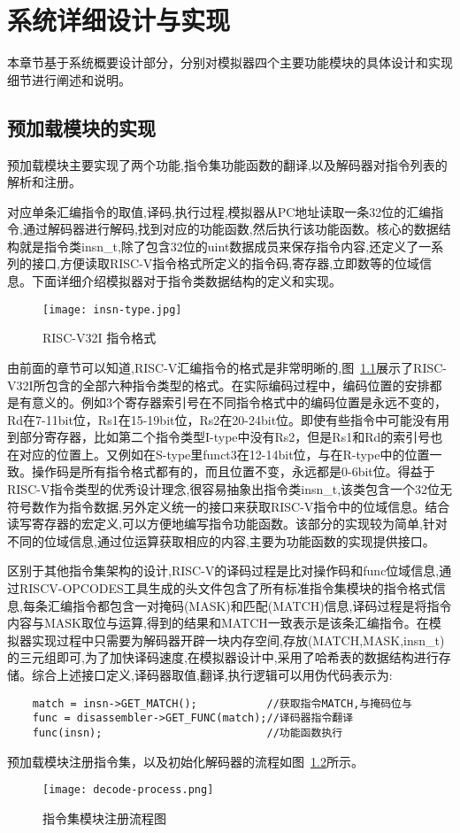 
\chapter{系统详细设计与实现}

本章节基于系统概要设计部分，分别对模拟器四个主要功能模块的具体设计和实现细节进行阐述和说明。

\section{预加载模块的实现}

预加载模块主要实现了两个功能,指令集功能函数的翻译,以及解码器对指令列表的解析和注册。

对应单条汇编指令的取值,译码,执行过程,模拟器从PC地址读取一条32位的汇编指令,通过解码器进行解码,找到对应的功能函数,然后执行该功能函数。核心的数据结构就是指令类insn\_t,除了包含32位的uint数据成员来保存指令内容,还定义了一系列的接口,方便读取RISC-V指令格式所定义的指令码,寄存器,立即数等的位域信息。下面详细介绍模拟器对于指令类数据结构的定义和实现。
\begin{figure}[h]
    \centering
    \texttt{[image: insn-type.jpg]}
    \caption{RISC-V32I 指令格式}
    \label{fig:insn-type}
\end{figure}


由前面的章节可以知道,RISC-V汇编指令的格式是非常明晰的,图~\ref{fig:insn-type}展示了RISC-V32I所包含的全部六种指令类型的格式。在实际编码过程中，编码位置的安排都是有意义的。例如3个寄存器索引号在不同指令格式中的编码位置是永远不变的，Rd在7-11bit位，Rs1在15-19bit位，Rs2在20-24bit位。即使有些指令中可能没有用到部分寄存器，比如第二个指令类型I-type中没有Rs2，但是Rs1和Rd的索引号也在对应的位置上。又例如在S-type里funct3在12-14bit位，与在R-type中的位置一致。操作码是所有指令格式都有的，而且位置不变，永远都是0-6bit位。得益于RISC-V指令类型的优秀设计理念,很容易抽象出指令类insn\_t,该类包含一个32位无符号数作为指令数据,另外定义统一的接口来获取RISC-V指令中的位域信息。结合读写寄存器的宏定义,可以方便地编写指令功能函数。该部分的实现较为简单,针对不同的位域信息,通过位运算获取相应的内容,主要为功能函数的实现提供接口。


区别于其他指令集架构的设计,RISC-V的译码过程是比对操作码和func位域信息,通过RISCV-OPCODES工具生成的头文件包含了所有标准指令集模块的指令格式信息,每条汇编指令都包含一对掩码(MASK)和匹配(MATCH)信息,译码过程是将指令内容与MASK取位与运算,得到的结果和MATCH一致表示是该条汇编指令。在模拟器实现过程中只需要为解码器开辟一块内存空间,存放(MATCH,MASK,insn\_t)的三元组即可,为了加快译码速度,在模拟器设计中,采用了哈希表的数据结构进行存储。综合上述接口定义,译码器取值,翻译,执行逻辑可以用伪代码表示为:
\begin{lstlisting}
    match = insn->GET_MATCH();           //获取指令MATCH,与掩码位与
    func = disassembler->GET_FUNC(match);//译码器指令翻译
    func(insn);                          //功能函数执行
\end{lstlisting}
预加载模块注册指令集，以及初始化解码器的流程如图~\ref{fig:decode-process}所示。
\begin{figure}[H]
  \centering
  \texttt{[image: decode-process.png]}
  \caption{指令集模块注册流程图}
  \label{fig:decode-process}
\end{figure}


